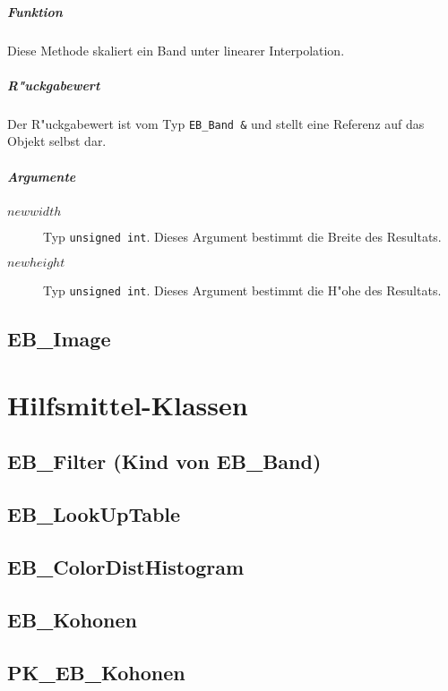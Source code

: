 \documentclass[12pt,a4paper,draft,twoside,onecolumn,titlepage]{book}
\newcommand{\carg}[1]{$ #1 $}
\newcommand{\ctyp}[1]{{\tt #1}}
\begin{document}
\subsubsection{Funktion}
Diese Methode skaliert ein Band unter linearer Interpolation.
\subsubsection{R"uckgabewert}
Der R"uckgabewert ist vom Typ \ctyp{EB\_Band \&} und stellt eine Referenz auf das Objekt selbst dar. 
\subsubsection{Argumente}
\begin{description}
\item[\carg{newwidth}]{Typ \ctyp{unsigned int}. Dieses Argument bestimmt die Breite des Resultats.}
\item[\carg{newheight}]{Typ \ctyp{unsigned int}. Dieses Argument bestimmt die H"ohe des Resultats.}
\end{description}





\chapter{EB\_Image}
\label{classebimage}
\part{Hilfsmittel-Klassen}
\chapter{EB\_Filter (Kind von EB\_Band)}
\label{classebfilter}
\chapter{EB\_LookUpTable}
\label{classeblookuptable}
\chapter{EB\_ColorDistHistogram}
\label{classcolordisthistogram}
\chapter{EB\_Kohonen}
\label{classebkohonen}
\chapter{PK\_EB\_Kohonen}
\label{classpkebkohonen}
\end{document}

